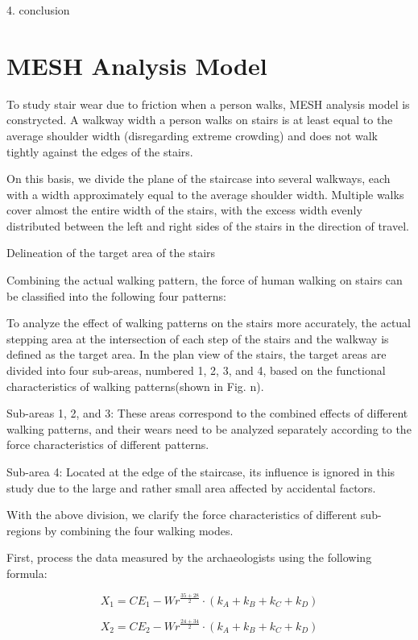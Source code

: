 \documentclass{mcmthesis}
\begin{document}
4. conclusion

\section{MESH Analysis Model}
To study stair wear due to friction when a person walks, MESH analysis model is constrycted. A walkway width a person walks on stairs is at least equal to the average shoulder width (disregarding extreme crowding) and does not walk tightly against the edges of the stairs. 

On this basis, we divide the plane of the staircase into several walkways, each with a width approximately equal to the average shoulder width. Multiple walks cover almost the entire width of the stairs, with the excess width evenly distributed between the left and right sides of the stairs in the direction of travel.

Delineation of the target area of the stairs

Combining the actual walking pattern, the force of human walking on stairs can be classified into the following four patterns:




To analyze the effect of walking patterns on the stairs more accurately, the actual stepping area at the intersection of each step of the stairs and the walkway is defined as the target area. In the plan view of the stairs, the target areas are divided into four sub-areas, numbered 1, 2, 3, and 4, based on the functional characteristics of walking patterns(shown in Fig. n).


Sub-areas 1, 2, and 3: These areas correspond to the combined effects of different walking patterns, and their wears need to be analyzed separately according to the force characteristics of different patterns.

Sub-area 4: Located at the edge of the staircase, its influence is ignored in this study due to the large and rather small area affected by accidental factors.

With the above division, we clarify the force characteristics of different sub-regions by combining the four walking modes.

First, process the data measured by the archaeologists using the following formula:

\[ X_1 = CE_1 - Wr^{\frac{35 + 28}{2}} \cdot \left(k_A + k_B + k_C + k_D\right) \]

\[ X_2 = CE_2 - Wr^{\frac{24 + 34}{2}} \cdot \left(k_A + k_B + k_C + k_D\right) \]
\end{document}
